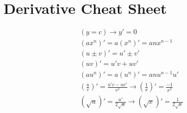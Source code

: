 \newpage
\section{Derivative Cheat Sheet}
\begin{multicols}{2}
\begin{align*}
&(y = c)\to y' = 0 \\
&(ax^n)' = a(x^n)' = anx^{n-1} \\
&(u \pm v)' = u' \pm v' \\
&(uv)' = u'v + uv' \\
&(au^n)' = a(u^n)' = anu^{n-1}u' \\
&(\frac{u}{v})' = \frac{u'v - uv'}{v^2} \to (\frac{1}{x})' = \frac{-1}{x^2} \\
&(\sqrt{u})' = \frac{u'}{2\sqrt{u}} \to (\sqrt{x})' = \frac{1}{2\sqrt{x}} \\
\end{align*}

\end{multicols}